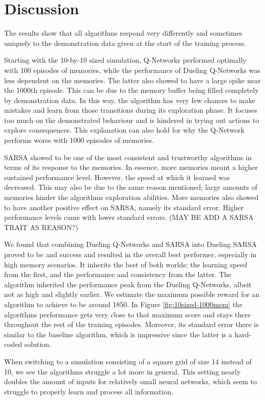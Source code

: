 \section{Discussion}\label{sec:discussion}
The results show that all algorithms respond very differently and sometimes uniquely to the demonstration data given at the start of the training process. 

Starting with the 10-by-10 sized simulation, Q-Networks performed optimally with 100 episodes of memories, while the performance of Dueling Q-Networks was less dependent on the memories. The latter also showed to have a large spike near the 1000th episode. This can be due to the memory buffer being filled completely by demonstration data. In this way, the algorithm has very few chances to make mistakes and learn from those transitions during its exploration phase. It focuses too much on the demonstrated behaviour and is hindered in trying out actions to explore consequences. This explanation can also hold for why the Q-Network performs worse with 1000 episodes of memories.

SARSA showed to be one of the most consistent and trustworthy algorithms in terms of its response to the memories. In essence, more memories meant a higher sustained performance level. However, the speed at which it learned was decreased. This may also be due to the same reason mentioned; large amounts of memories hinder the algorithms exploration abilities. More memories also showed to have another positive effect on SARSA, namely its standard error. Higher performance levels came with lower standard errors. (MAY BE ADD A SARSA TRAIT AS REASON?)

We found that combining Dueling Q-Networks and SARSA into Dueling SARSA proved to be and success and resulted in the overall best performer, especially in high memory scenarios. It inherits the best of both worlds; the learning speed from the first, and the performance and consistency from the latter. The algorithm inherited the performance peak from the Dueling Q-Networks, albeit not as high and slightly earlier. We estimate the maximum possible reward for an algorithm to achieve to be around 1850. In Figure \ref{fig:10sized-1000mem} the algorithms performance gets very close to that maximum score and stays there throughout the rest of the training episodes. Moreover, its standard error there is similar to the baseline algorithm, which is impressive since the latter is a hard-coded solution.


When switching to a simulation consisting of a square grid of size 14 instead of 10, we see the algorithms struggle a lot more in general. This setting nearly doubles the amount of inputs for relatively small neural networks, which seem to struggle to properly learn and process all information.

